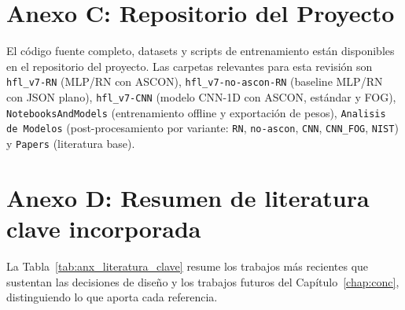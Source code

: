 \begin{appendix}
\section{Anexo C: Repositorio del Proyecto}
\label{anx:repositorio}

El código fuente completo, datasets y scripts de entrenamiento están disponibles en el repositorio del proyecto. Las carpetas relevantes para esta revisión son \texttt{hfl\_v7-RN} (MLP/RN con ASCON), \texttt{hfl\_v7-no-ascon-RN} (baseline MLP/RN con JSON plano), \texttt{hfl\_v7-CNN} (modelo CNN-1D con ASCON, estándar y FOG), \texttt{NotebooksAndModels} (entrenamiento offline y exportación de pesos), \texttt{Analisis de Modelos} (post-procesamiento por variante: \texttt{RN}, \texttt{no-ascon}, \texttt{CNN}, \texttt{CNN\_FOG}, \texttt{NIST}) y \texttt{Papers} (literatura base).

\section{Anexo D: Resumen de literatura clave incorporada}
\label{anx:literatura}

La Tabla~\ref{tab:anx_literatura_clave} resume los trabajos más recientes que sustentan las decisiones de diseño y los trabajos futuros del Capítulo~\ref{chap:conc}, distinguiendo lo que aporta cada referencia.


\end{appendix}
